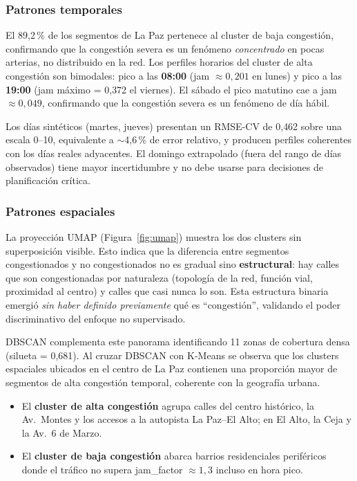 \documentclass[12pt,a4paper]{article}
\begin{document}
\subsubsection{Patrones temporales}

El 89{,}2\,\% de los segmentos de La Paz pertenece al cluster de baja
congestión, confirmando que la congestión severa es un fenómeno
\emph{concentrado} en pocas arterias, no distribuido en la red.
Los perfiles horarios del cluster de alta congestión son bimodales:
pico a las \textbf{08:00} (jam $\approx 0{,}201$ en lunes) y pico
a las \textbf{19:00} (jam máximo = 0{,}372 el viernes).
El sábado el pico matutino cae a jam $\approx 0{,}049$, confirmando
que la congestión severa es un fenómeno de día hábil.

Los días sintéticos (martes, jueves) presentan un RMSE-CV de 0{,}462
sobre una escala 0--10, equivalente a $\sim$4{,}6\,\% de error relativo,
y producen perfiles coherentes con los días reales adyacentes.
El domingo extrapolado (fuera del rango de días observados) tiene mayor
incertidumbre y no debe usarse para decisiones de planificación crítica.

\subsubsection{Patrones espaciales}

La proyección UMAP (Figura~\ref{fig:umap}) muestra los dos clusters sin
superposición visible.
Esto indica que la diferencia entre segmentos congestionados y no
congestionados no es gradual sino \textbf{estructural}: hay calles que
son congestionadas por naturaleza (topología de la red, función vial,
proximidad al centro) y calles que casi nunca lo son.
Esta estructura binaria emergió \emph{sin haber definido previamente}
qué es ``congestión'', validando el poder discriminativo del enfoque
no supervisado.

DBSCAN complementa este panorama identificando 11 zonas de cobertura
densa (silueta = 0{,}681).
Al cruzar DBSCAN con K-Means se observa que los clusters espaciales
ubicados en el centro de La Paz contienen una proporción mayor de
segmentos de alta congestión temporal, coherente con la geografía urbana.

\begin{itemize}
  \item El \textbf{cluster de alta congestión} agrupa calles del
    centro histórico, la Av.\ Montes y los accesos a la autopista
    La Paz--El Alto; en El Alto, la Ceja y la Av.\ 6 de Marzo.

  \item El \textbf{cluster de baja congestión} abarca barrios residenciales
    periféricos donde el tráfico no supera jam\_factor $\approx 1{,}3$
    incluso en hora pico.
\end{itemize}
\end{document}
